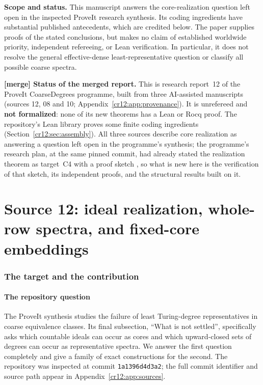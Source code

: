 \documentclass[11pt,letterpaper]{article}
\theoremstyle{plain}
\theoremstyle{definition}
\theoremstyle{remark}
\numberwithin{equation}{section}
\newcommand{\shortrepo}{\texttt{1a1396d4d3a2}}
\begin{document}
\begin{statusbox}
\textbf{Scope and status.} This manuscript answers the core-realization question
left open in the inspected ProveIt research synthesis. Its coding ingredients
have substantial published antecedents, which are credited below. The paper
supplies proofs of the stated conclusions, but makes no claim of established
worldwide priority, independent refereeing, or Lean verification. In particular,
it does not resolve the general effective-dense least-representative question or
classify all possible coarse spectra.

\textbf{[merge] Status of the merged report.} This is research report~12 of the
ProveIt CoarseDegrees programme, built from three AI-assisted manuscripts
(sources 12, 08 and 10; Appendix~\ref{cr12:app:provenance}). It is unrefereed
and \textbf{not formalized}: none of its new theorems has a Lean or Rocq proof.
The repository's Lean library 
proves some finite coding ingredients (Section~\ref{cr12:sec:assembly}). All three
sources describe core realization as answering a question left open in the
programme's synthesis; the programme's research plan, at the same pinned
commit, had already stated the realization theorem as target~C4 with a proof
sketch \cite{Plan}, so what is new here is the verification of that sketch,
its independent proofs, and the structural results built on it.
\end{statusbox}
\newpage
\tableofcontents
\newpage

\part{Source 12: ideal realization, whole-row spectra, and fixed-core embeddings}\label{cr12:part1}
\section{The target and the contribution}\label{cr12:sec:intro}
\subsection{The repository question}
The ProveIt synthesis \cite{Repo} studies the failure of least Turing-degree
representatives in coarse equivalence classes. Its final subsection, ``What is
not settled'', specifically asks which countable ideals can occur as cores and
which upward-closed sets of degrees can occur as representative spectra. We
answer the first question completely and give a family of exact constructions
for the second. The repository was inspected at commit
\shortrepo; the full commit identifier and source path appear in
Appendix~\ref{cr12:app:sources}.
\end{document}
